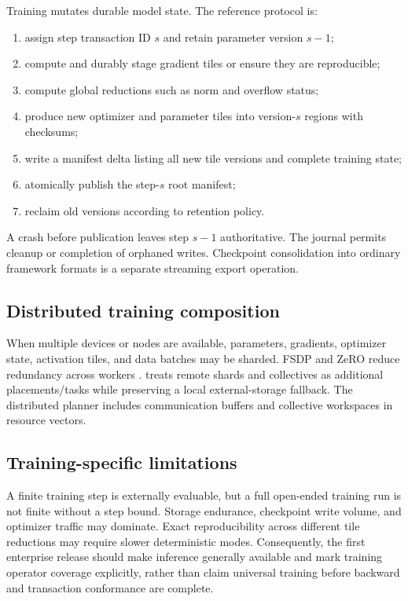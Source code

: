 Training mutates durable model state. The reference protocol is:

\begin{enumerate}
  \item assign step transaction ID $s$ and retain parameter version $s-1$;
  \item compute and durably stage gradient tiles or ensure they are reproducible;
  \item compute global reductions such as norm and overflow status;
  \item produce new optimizer and parameter tiles into version-$s$ regions with checksums;
  \item write a manifest delta listing all new tile versions and complete training state;
  \item atomically publish the step-$s$ root manifest;
  \item reclaim old versions according to retention policy.
\end{enumerate}

A crash before publication leaves step $s-1$ authoritative. The journal permits cleanup or completion of orphaned writes. Checkpoint consolidation into ordinary framework formats is a separate streaming export operation.

\subsection{Distributed training composition}

When multiple devices or nodes are available, parameters, gradients, optimizer state, activation tiles, and data batches may be sharded. FSDP and ZeRO reduce redundancy across workers \cite{zhao2023fsdp,rajbhandari2020zero}. \AMS treats remote shards and collectives as additional placements/tasks while preserving a local external-storage fallback. The distributed planner includes communication buffers and collective workspaces in resource vectors.

\subsection{Training-specific limitations}

A finite training step is externally evaluable, but a full open-ended training run is not finite without a step bound. Storage endurance, checkpoint write volume, and optimizer traffic may dominate. Exact reproducibility across different tile reductions may require slower deterministic modes. Consequently, the first enterprise release should make inference generally available and mark training operator coverage explicitly, rather than claim universal training before backward and transaction conformance are complete.
